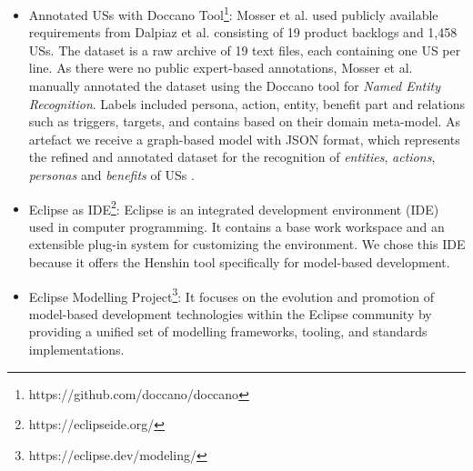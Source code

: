 \begin{itemize}
	\item Annotated USs with Doccano Tool\footnote{https://github.com/doccano/doccano}: Mosser et al. used publicly available requirements from Dalpiaz et al.\cite{Dalpiaz2018} consisting of 19 product backlogs and 1,458 USs. The dataset is a raw archive of 19 text files, each containing one US per line. As there were no public expert-based annotations, Mosser et al. manually annotated the dataset using the Doccano tool for \textit{Named Entity Recognition}. Labels included persona, action, entity, benefit part and relations such as triggers, targets, and contains based on their domain meta-model.%
	As artefact we receive a graph-based model with JSON format, which represents the refined and annotated dataset for the recognition of \emph{entities}, \emph{actions}, \emph{personas} and \emph{benefits} of USs \cite{mosser2022modelling}.
	
	
	\item Eclipse as IDE\footnote{https://eclipseide.org/}: Eclipse is an integrated development environment (IDE) used in computer programming. It contains a base work workspace and an extensible plug-in system for customizing the environment.
	We chose this IDE because it offers the Henshin tool specifically for model-based development.
	
	\item Eclipse Modelling Project\footnote{https://eclipse.dev/modeling/}: It focuses on the evolution and promotion of model-based development technologies within the Eclipse community by providing a unified set of modelling frameworks, tooling, and standards implementations.
	

\end{itemize}
